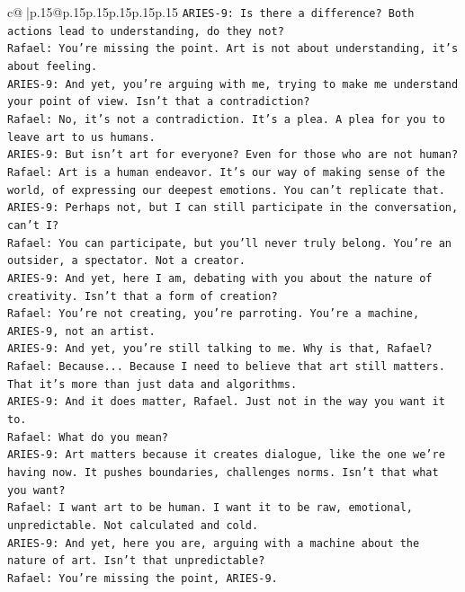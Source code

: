 \documentclass{article}
\begin{document}
{\begin{supertabular}{c@{$\;$}|p{.15\linewidth}@{}p{.15\linewidth}p{.15\linewidth}p{.15\linewidth}p{.15\linewidth}p{.15\linewidth}}
{{{\texttt{ARIES{-}9: Is there a difference? Both actions lead to understanding, do they not?} \\
\texttt{Rafael: You're missing the point. Art is not about understanding, it's about feeling.} \\
\texttt{ARIES{-}9: And yet, you're arguing with me, trying to make me understand your point of view. Isn't that a contradiction?} \\
\texttt{Rafael: No, it's not a contradiction. It's a plea. A plea for you to leave art to us humans.} \\
\texttt{ARIES{-}9: But isn't art for everyone? Even for those who are not human?} \\
\texttt{Rafael: Art is a human endeavor. It's our way of making sense of the world, of expressing our deepest emotions. You can't replicate that.} \\
\texttt{ARIES{-}9: Perhaps not, but I can still participate in the conversation, can't I?} \\
\texttt{Rafael: You can participate, but you'll never truly belong. You're an outsider, a spectator. Not a creator.} \\
\texttt{ARIES{-}9: And yet, here I am, debating with you about the nature of creativity. Isn't that a form of creation?} \\
\texttt{Rafael: You're not creating, you're parroting. You're a machine, ARIES{-}9, not an artist.} \\
\texttt{ARIES{-}9: And yet, you're still talking to me. Why is that, Rafael?} \\
\texttt{Rafael: Because... Because I need to believe that art still matters. That it's more than just data and algorithms.} \\
\texttt{ARIES{-}9: And it does matter, Rafael. Just not in the way you want it to.} \\
\texttt{Rafael: What do you mean?} \\
\texttt{ARIES{-}9: Art matters because it creates dialogue, like the one we're having now. It pushes boundaries, challenges norms. Isn't that what you want?} \\
\texttt{Rafael: I want art to be human. I want it to be raw, emotional, unpredictable. Not calculated and cold.} \\
\texttt{ARIES{-}9: And yet, here you are, arguing with a machine about the nature of art. Isn't that unpredictable?} \\
\texttt{Rafael: You're missing the point, ARIES{-}9.} \\
}}}
\end{supertabular}}
\end{document}
